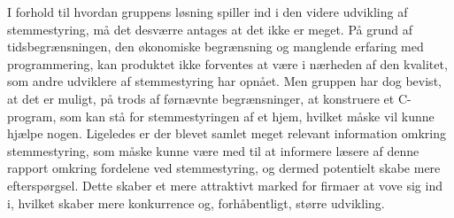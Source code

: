 I forhold til hvordan gruppens løsning spiller ind i den videre udvikling af stemmestyring, må det desværre antages at det ikke er meget. På grund af tidsbegrænsningen, den økonomiske begrænsning og manglende erfaring med programmering, kan produktet ikke forventes at være i nærheden af den kvalitet, som andre udviklere af stemmestyring har opnået. Men gruppen har dog bevist, at det er muligt, på trods af førnævnte begrænsninger, at konstruere et C-program, som kan stå for stemmestyringen af et hjem, hvilket måske vil kunne hjælpe nogen. Ligeledes er der blevet samlet meget relevant information omkring stemmestyring, som måske kunne være med til at informere læsere af denne rapport omkring fordelene ved stemmestyring, og dermed potentielt skabe mere efterspørgsel. Dette skaber et mere attraktivt marked for firmaer at vove sig ind i, hvilket skaber mere konkurrence og, forhåbentligt, større udvikling.


